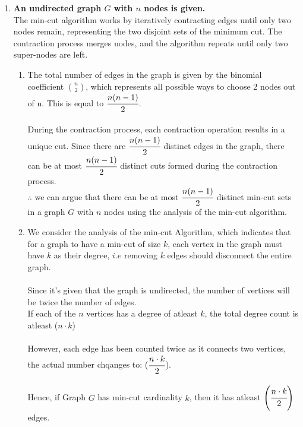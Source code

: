 \documentclass{article}
\begin{document}
\begin{enumerate}
\newpage
\item \textbf{An undirected graph $G$ with $n$ nodes is given.}\\
  \textnormal{The min-cut algorithm works by iteratively contracting edges until only two nodes remain, representing the two disjoint sets of the minimum cut. The contraction process merges nodes, and the algorithm repeats until only two super-nodes are left.}\\
  \begin{enumerate}
    \item \textnormal{The total number of edges in the graph is given by the binomial coefficient \( \binom{n}{2} \), which represents all possible ways to choose 2 nodes out of n. This is equal to \(\cfrac{n(n-1)}{2}\).}\\\\
    \textnormal{During the contraction process, each contraction operation results in a unique cut. Since there are \(\cfrac{n(n-1)}{2}\) distinct edges in the graph, there can be at most \(\cfrac{n(n-1)}{2}\) distinct cuts formed during the contraction process.}\\
    \(\therefore\)  we can argue that there can be at most \(\cfrac{n(n-1)}{2}\) distinct min-cut sets in a graph $G$ with $n$ nodes using the analysis of the min-cut algorithm.\\
    \item We consider the analysis of the min-cut Algorithm, which indicates that for a graph to have a min-cut of size $k$, each vertex in the graph must have $k$ as their degree, $i.e$ removing $k$ edges should disconnect the entire graph.\\\\
    Since it's given that the graph is undirected, the number of vertices will be twice the number of edges.\\
    If each of the $n$ vertices has a degree of atleast $k$, the total degree count is atleast ($n\cdot k$)\\\\
    However, each edge has been counted twice as it connects two vertices, the actual number chqanges to: ($\cfrac{n\cdot k}{2}$).\\\\
    Hence, if Graph $G$ has min-cut cardinality $k$, then it has atleast $\left(\cfrac{n\cdot k}{2}\right)$ edges.
  \end{enumerate}


\end{enumerate}
\end{document}
